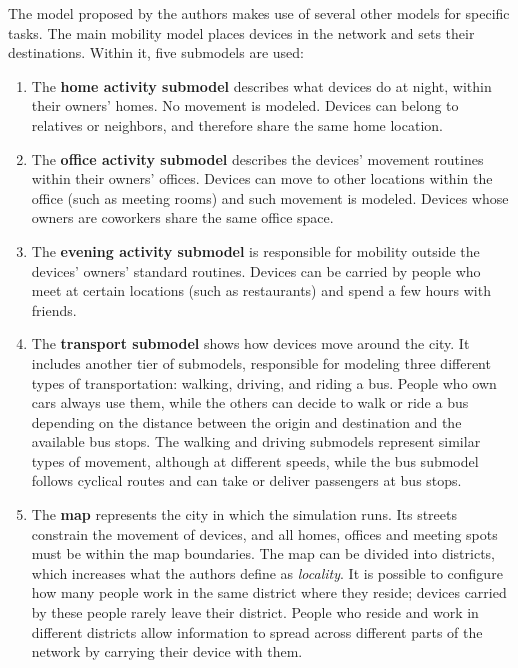 The model proposed by the authors makes use of several other models for specific tasks.
The main mobility model places devices in the network and sets their destinations.
Within it, five submodels are used:
\begin{enumerate}
\item 
The \textbf{home activity submodel} describes what devices do at night, within their owners' homes.
No movement is modeled.
Devices can belong to relatives or neighbors, and therefore share the same home location.
\item 
The \textbf{office activity submodel} describes the devices' movement routines within their owners' offices.
Devices can move to other locations within the office (such as meeting rooms) and such movement is modeled.
Devices whose owners are coworkers share the same office space.
\item 
The \textbf{evening activity submodel} is responsible for mobility outside the devices' owners' standard routines. 
Devices can be carried by people who meet at certain locations (such as restaurants) and spend a few hours with friends.
\item
The \textbf{transport submodel} shows how devices move around the city.
It includes another tier of submodels, responsible for modeling three different types of transportation: walking, driving, and riding a bus.
People who own cars always use them, while the others can decide to walk or ride a bus depending on the distance between the origin and destination and the available bus stops.
The walking and driving submodels represent similar types of movement, although at different speeds, while the bus submodel follows cyclical routes and can take or deliver passengers at bus stops.
\item
The \textbf{map} represents the city in which the simulation runs.
Its streets constrain the movement of devices, and all homes, offices and meeting spots must be within the map boundaries.
The map can be divided into districts, which increases what the authors define as \textit{locality}.
It is possible to configure how many people work in the same district where they reside; devices carried by these people rarely leave their district.
People who reside and work in different districts allow information to spread across different parts of the network by carrying their device with them.
\end{enumerate}


